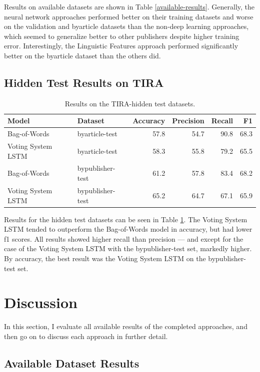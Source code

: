 \documentclass[11pt, a4paper]{article}
\begin{document}
Results on available datasets are shown in Table \ref{available-results}. Generally, the neural network approaches performed better on their training datasets and worse on the validation and byarticle datasets than the non-deep learning approaches, which seemed to generalize better to other publishers despite higher training error. Interestingly, the Linguistic Features approach performed significantly better on the byarticle dataset than the others did.

\subsection{Hidden Test Results on TIRA}

\begin{table}[t]
\centering
\begin{tabular}{|l||l||r|r|r|r|}
\hline \bf Model & \bf Dataset & \bf Accuracy & \bf Precision & \bf Recall & \bf F1 \\ \hline
Bag-of-Words & byarticle-test & 57.8 & 54.7 & 90.8 & 68.3 \\
Voting System LSTM & byarticle-test & 58.3 & 55.8 & 79.2 & 65.5 \\
Bag-of-Words & bypublisher-test & 61.2 & 57.8 & 83.4 & 68.2 \\
Voting System LSTM & bypublisher-test & 65.2 & 64.7 & 67.1 & 65.9 \\
\hline
\end{tabular}
\caption{\label{hidden-results} Results on the TIRA-hidden test datasets. }
\end{table}

Results for the hidden test datasets can be seen in Table \ref{hidden-results}. The Voting System LSTM tended to outperform the Bag-of-Words model in accuracy, but had lower f1 scores. All results showed higher recall than precision --- and except for the case of the Voting System LSTM with the bypublisher-test set, markedly higher. By accuracy, the best result was the Voting System LSTM on the bypublisher-test set.

\section{Discussion}

In this section, I evaluate all available results of the completed approaches, and then go on to discuss each approach in further detail.

\subsection{Available Dataset Results}
\end{document}
